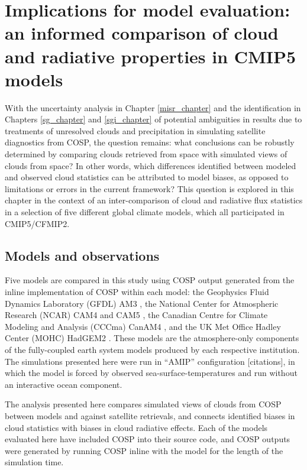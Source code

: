 \chapter{Implications for model evaluation: an informed comparison of cloud and
radiative properties in CMIP5 models}\label{cmip5_chapter}
With the uncertainty analysis in Chapter \ref{misr_chapter} and the identification in Chapters \ref{sg_chapter} and \ref{sgi_chapter} of potential ambiguities in results due to treatments of unresolved clouds and precipitation in simulating satellite diagnostics from COSP, the question remains: what conclusions can be robustly determined by comparing clouds retrieved from space with simulated views of clouds from space? In other words, which differences identified between modeled and observed cloud statistics can be attributed to model biases, as opposed to limitations or errors in the current framework? This question is explored in this chapter in the context of an inter-comparison of cloud and radiative flux statistics in a selection of five different global climate models, which all participated in CMIP5/CFMIP2.

\section{Models and observations}
Five models are compared in this study using COSP output generated from the inline implementation of COSP within each model: the Geophysics Fluid Dynamics Laboratory (GFDL) AM3 \citep{donner_et_al_2011}, the National Center for Atmospheric Research (NCAR) CAM4 \citep{neale_et_al_2010a} and CAM5 \citep{neale_et_al_2010b}, the Canadian Centre for Climate Modeling and Analysis (CCCma) CanAM4 \citep{von_salzen_et_al_2012}, and the UK Met Office Hadley Center (MOHC) HadGEM2 \citep{martin_et_al_2011}. These models are the atmosphere-only components of the fully-coupled earth system models produced by each respective institution. The simulations presented here were run in ``AMIP'' configuration [citations], in which the model is forced by observed sea-surface-temperatures and run without an interactive ocean component.

The analysis presented here compares simulated views of clouds from COSP between models and against satellite retrievals, and connects identified biases in cloud statistics with biases in cloud radiative effects. Each of the models evaluated here have included COSP into their source code, and COSP outputs were generated by running COSP inline with the model for the length of the simulation time. 

